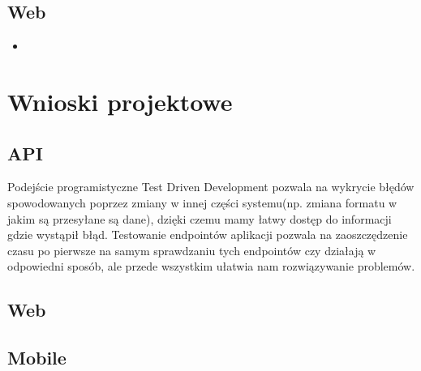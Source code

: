 \documentclass{article}
\begin{document}
\subsection{Web}
\begin{itemize}
    \item 
\end{itemize}

\section{Wnioski projektowe}
\subsection{API}
Podejście programistyczne Test Driven Development pozwala na wykrycie błędów spowodowanych poprzez zmiany w innej części systemu(np. zmiana formatu w jakim są przesyłane są dane), dzięki czemu mamy łatwy dostęp do informacji gdzie wystąpił błąd. Testowanie endpointów aplikacji pozwala na zaoszczędzenie czasu po pierwsze na samym sprawdzaniu tych endpointów czy działają w odpowiedni sposób, ale przede wszystkim ułatwia nam rozwiązywanie problemów.
\subsection{Web}

\subsection{Mobile}
\end{document}
